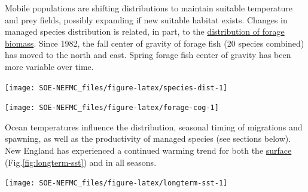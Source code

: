 \documentclass[
  10pt,
]{article}
\let\origfigure\figure
\let\endorigfigure\endfigure
\renewenvironment{figure}[1][2] {
    \expandafter\origfigure\expandafter[H]
} {
    \endorigfigure
}
\begin{document}
Mobile populations are shifting distributions to maintain suitable temperature and prey fields, possibly expanding if new suitable habitat exists. Changes in managed species distribution is related, in part, to the \href{https://noaa-edab.github.io/catalog/forage-fish-index.html}{distribution of forage biomass}. Since 1982, the fall center of gravity of forage fish (20 species combined) has moved to the north and east. Spring forage fish center of gravity has been more variable over time.

\begin{figure}

{\centering \texttt{[image: SOE-NEFMC\_files/figure-latex/species-dist-1]} 

}

\caption{Aggregate species distribution metrics for species in the Northeast Large Marine Ecosystem.}\label{fig:species-dist}
\end{figure}
\begin{figure}

{\centering \texttt{[image: SOE-NEFMC\_files/figure-latex/forage-cog-1]} 

}

\caption{Eastward (left) and northward (right) shifts in the center of gravity for 20 forage fish species on the Northeast U.S. Shelf.}\label{fig:forage-cog}
\end{figure}

Ocean temperatures influence the distribution, seasonal timing of migrations and spawning, as well as the productivity of managed species (see sections below). New England has experienced a continued warming trend for both the \href{https://noaa-edab.github.io/catalog/sea-surface-temperature-anomaly.html}{surface} (Fig.\ref{fig:longterm-sst}) and in all seasons.

\begin{figure}

{\centering \texttt{[image: SOE-NEFMC\_files/figure-latex/longterm-sst-1]} 

}

\caption{Mean sea surface temperature across the entire Mid-Atlantic shelf.}\label{fig:longterm-sst}
\end{figure}
\end{document}
